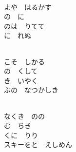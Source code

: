 \documentclass[10pt,b5j]{tarticle} %
\begin{document}
\vspace{1.5em} %
\newcommand{\linespace}{0.5em} %
\newcommand{\blocksize}{0.5\hsize} %
\newcommand{\itemmargin}{3em} %
\begin{enumerate} %
    \setlength{\itemindent}{\itemmargin} %
    \begin{minipage}[c]{\blocksize}
    
        \vspace{\linespace}
        \item~\\
        よや　はるかす\\
        の　に\\
        のは　りてて\\
        に　れぬ
        
    \end{minipage}
    \begin{minipage}[c]{\blocksize}
        
        \vspace{\linespace}
        \item~\\
        こそ　しかる\\
        の　くして\\
        き　いやく\\
        ぶの　なつかしき
        
    \end{minipage}
    \begin{minipage}[c]{\blocksize}
        
        \vspace{\linespace}
        \item~\\
        なくき　のの\\
        む　ちき\\
        くに　りり\\
        スキーをと　えしめん
        

\end{minipage}
\end{enumerate}
\end{document}
